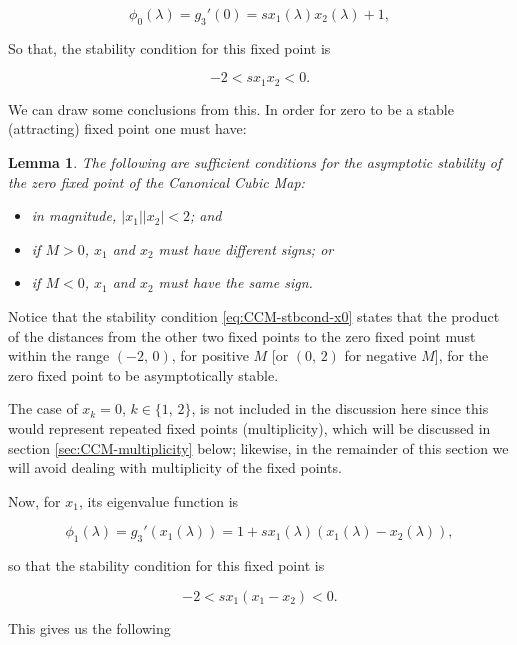 \documentclass[10pt,twoside,titlepage]{book}
\numberwithin{equation}{chapter}
\numberwithin{figure}{chapter}
\numberwithin{table}{chapter}
\theoremstyle{plain}%
\newtheorem{lem}[thm]{Lemma}
\theoremstyle{definition}
\theoremstyle{remark}
\begin{document}
\[\phi_0(\lambda)=g_3'(0)=sx_1(\lambda)x_2(\lambda)+1,\]

So that, the stability condition for this fixed point is

\begin{equation}
	\label{eq:CCM-stbcond-x0}
	-2<sx_1x_2<0.
\end{equation}

We can draw some conclusions from this. In order for zero to be a stable (attracting) fixed point one must have:

\begin{lem}
	The following are sufficient conditions for the asymptotic stability of the zero fixed point of the Canonical Cubic Map:
	\begin{itemize}
		\item in magnitude, $\vert x_1\vert\vert x_2\vert<2$; and
		\item if $M>0$, $x_1$ and $x_2$ must have \emph{different} signs; or
		\item if $M<0$, $x_1$ and $x_2$ must have \emph{the same} sign.
	\end{itemize}
\end{lem}

Notice that the stability condition \eqref{eq:CCM-stbcond-x0} states that the product of the distances from the other two fixed points to the zero fixed point must within the range $(-2,\,0)$, for positive $M$ [or $(0,\,2)$ for negative $M$], for the zero fixed point to be asymptotically stable.

The case of $x_k=0$, $k\in\{1,\,2\}$, is not included in the discussion here since this would represent repeated fixed points (multiplicity), which will be discussed in section \ref{sec:CCM-multiplicity} below; likewise, in the remainder of this section we will avoid dealing with multiplicity of the fixed points.

Now, for $x_1$, its eigenvalue function is

\[\phi_1(\lambda)=g_3'(x_1(\lambda))=1+sx_1(\lambda)(x_1(\lambda)-x_2(\lambda)),\]

so that the stability condition for this fixed point is

\begin{equation}
	-2<sx_1(x_1-x_2)<0.
	\label{eq:CCM-stbcond-x1}
\end{equation}

This gives us the following
\end{document}
